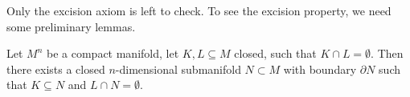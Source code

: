 \documentclass[a4paper,12pt]{article}
\begin{document}
\begin{comment}[Transversality, Sard, Mayer-Vi\"etoris,...]
Before checking the next axioms, we need to do some more differential topology. (Maybe I will put this in chapter 1\dots)

\begin{definition}[Tangent space\ \cite{lee}]
\end{definition}

Need a few more things, differential, etc.

\begin{definition}[Transversality\ \cite{brocker}]
    Let \(f:M\to N\) a smooth map between manifolds. Let \(U\subseteq N\) be an (\(n-k\))-dimensional submanifold of \(N\) 
\end{definition}
Maybe Lee's definition is better.\\

\begin{definition}[Regular value]
\end{definition}

\begin{theorem}[Sard's theorem\ \cite{lee}]
\end{theorem}

I will not prove this theorem, a proof can be found in\ \cite{lee}.

\begin{definition}[Seperating function\cite{brocker}]
\end{definition}

\begin{lemma}
    Slogan: The Mayer-Vi\"etoris sequence is equivalent to the excision axiom.
\end{lemma}

\begin{lemma}
    The Mayer-Vi\"etoris sequence
    \[\dots\xrightarrow{\partial}\mathfrak{N}_n(X_0\cap X_1)\xrightarrow{\alpha}\mathfrak{N}_n(X_0\oplus\mathfrak{N}_n(X_1))\xrightarrow{\beta}\mathfrak{N}_n(X)\xrightarrow{\partial}\mathfrak{N}_{n-1}(X_0\cap X_1)\xrightarrow{\alpha}\dots\]
    is exact.
\end{lemma}

\end{comment}

Only the excision axiom is left to check. To see the excision property, we need some preliminary lemmas.

\begin{lemma}\label{plemma}%
    Let \(M^n\) be a compact manifold, let \(K,L\subseteq M\) closed, such that \(K\cap L=\emptyset\). Then there exists a closed \(n\)-dimensional submanifold \(N\subset M\) with boundary \(\partial N\) such that \(K\subseteq N\) and \(L\cap N=\emptyset\).
\end{lemma}
\end{document}
